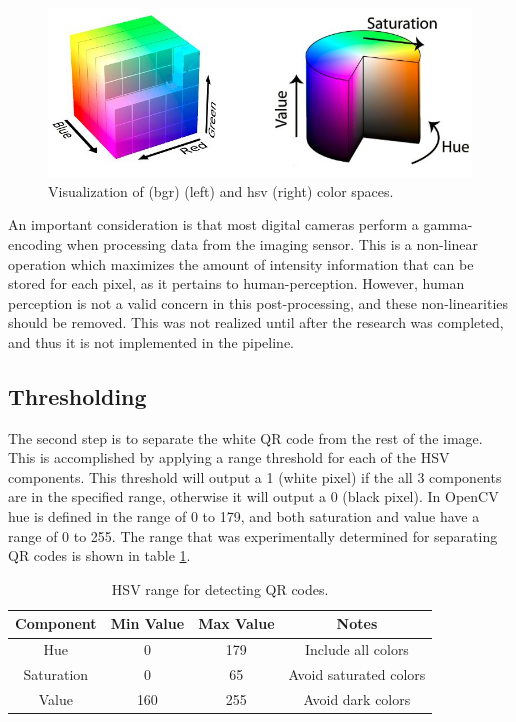 \begin{figure}
	\centering
    \includegraphics[width=5.5in]{figures/bgr_and_hsv.jpg}
    \caption[Color spaces]{Visualization of \ac{(bgr)} (left) and \ac{hsv} (right) color spaces.}
    \label{figure:color_spaces}
\end{figure} 

An important consideration is that most digital cameras perform a gamma-encoding when processing data from the imaging sensor.  This is a non-linear operation which maximizes the amount of intensity information that can be stored for each pixel, as it pertains to human-perception.  However, human perception is not a valid concern in this post-processing, and these non-linearities should be removed.  This was not realized until after the research was completed, and thus it is not implemented in the pipeline.

\subsection{Thresholding}
\label{section:qr_thresholding}

The second step is to separate the white QR code from the rest of the image.  This is accomplished by applying a range threshold for each of the HSV components.  This threshold will output a 1 (white pixel) if the all 3 components are in the specified range, otherwise it will output a 0 (black pixel).  In OpenCV hue is defined in the range of 0 to 179, and both saturation and value have a range of 0 to 255.  The range that was experimentally determined for separating QR codes is shown in table \ref{table:qr_hsv_ranges}.

\begin{table}
    \begin{center}
    \caption[QR Code Detection Values]{HSV range for detecting QR codes.}
    \begin{tabular}[c]{|c|c|c|c|}
        \hline
        Component & Min Value & Max Value & Notes \\
        \hline
        Hue        & 0   & 179 & Include all colors      \\
        Saturation & 0   & 65  & Avoid saturated colors  \\
        Value      & 160 & 255 & Avoid dark colors       \\
        \hline
    \end{tabular}
    \label{table:qr_hsv_ranges}
   \end{center}
\end{table}

